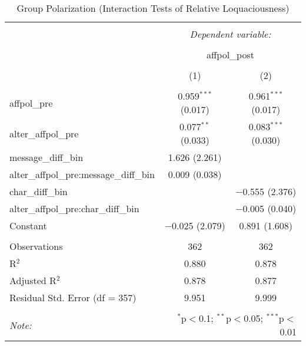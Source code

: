 
\begin{table}[H] \centering 
  \caption{Group Polarization (Interaction Tests of Relative Loquaciousness)} 
  \label{tab:s2_group_polarization_interactions} 
\begin{tabular}{@{\extracolsep{5pt}}lcc} 
\\[-1.8ex]\hline 
\hline \\[-1.8ex] 
 & \multicolumn{2}{c}{\textit{Dependent variable:}} \\ 
\cline{2-3} 
\\[-1.8ex] & \multicolumn{2}{c}{affpol\_post} \\ 
\\[-1.8ex] & (1) & (2)\\ 
\hline \\[-1.8ex] 
 affpol\_pre & 0.959$^{***}$ (0.017) & 0.961$^{***}$ (0.017) \\ 
  alter\_affpol\_pre & 0.077$^{**}$ (0.033) & 0.083$^{***}$ (0.030) \\ 
  message\_diff\_bin & 1.626 (2.261) &  \\ 
  alter\_affpol\_pre:message\_diff\_bin & 0.009 (0.038) &  \\ 
  char\_diff\_bin &  & $-$0.555 (2.376) \\ 
  alter\_affpol\_pre:char\_diff\_bin &  & $-$0.005 (0.040) \\ 
  Constant & $-$0.025 (2.079) & 0.891 (1.608) \\ 
 \hline \\[-1.8ex] 
Observations & 362 & 362 \\ 
R$^{2}$ & 0.880 & 0.878 \\ 
Adjusted R$^{2}$ & 0.878 & 0.877 \\ 
Residual Std. Error (df = 357) & 9.951 & 9.999 \\ 
\hline 
\hline \\[-1.8ex] 
\textit{Note:}  & \multicolumn{2}{r}{$^{*}$p$<$0.1; $^{**}$p$<$0.05; $^{***}$p$<$0.01} \\ 
\end{tabular} 
\end{table} 
